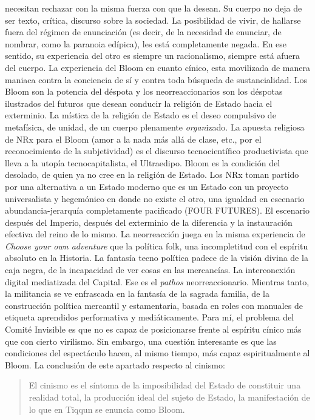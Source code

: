 \documentclass[
]{article}
\begin{document}
necesitan rechazar con la misma fuerza con que la desean. Su cuerpo no
deja de ser texto, crítica, discurso sobre la sociedad. La posibilidad
de vivir, de hallarse fuera del régimen de enunciación (es decir, de la
necesidad de enunciar, de nombrar, como la paranoia edípica), les está
completamente negada. En ese sentido, su experiencia del otro es siempre
un racionalismo, siempre está afuera del cuerpo. La experiencia del
Bloom en cuanto cínico, esta movilizada de manera maniaca contra la
conciencia de sí y contra toda búsqueda de sustancialidad. Los Bloom son
la potencia del déspota y los neorreaccionarios son los déspotas
ilustrados del futuros que desean conducir la religión de Estado hacia
el exterminio. La mística de la religión de Estado es el deseo
compulsivo de metafísica, de unidad, de un cuerpo plenamente
\emph{organ}izado. La apuesta religiosa de NRx para el Bloom (amor a la
nada más allá de clase, etc., por el reconocimiento de la subjetividad)
es el discurso tecnocientífico productivista que lleva a la utopía
tecnocapitalista, el Ultraedipo. Bloom es la condición del desolado, de
quien ya no cree en la religión de Estado. Los NRx toman partido por una
alternativa a un Estado moderno que es un Estado con un proyecto
universalista y hegemónico en donde no existe el otro, una igualdad en
escenario abundancia-jerarquía completamente pacificado (FOUR FUTURES).
El escenario después del Imperio, después del exterminio de la
diferencia y la instauración efectiva del reino de lo mismo. La
neorreacción juega en la misma experiencia de \emph{Choose your own
adventure} que la política folk, una incompletitud con el espíritu
absoluto en la Historia. La fantasía tecno política padece de la visión
divina de la caja negra, de la incapacidad de ver cosas en las
mercancías. La interconexión digital mediatizada del Capital. Ese es el
\emph{pathos} neorreaccionario. Mientras tanto, la militancia se ve
enfrascada en la fantasía de la sagrada familia, de la construcción
política mercantil y estamentaria, basada en roles con manuales de
etiqueta aprendidos performativa y mediáticamente. Para mí, el problema
del Comité Invisible es que no es capaz de posicionarse frente al
espíritu cínico más que con cierto virilismo. Sin embargo, una cuestión
interesante es que las condiciones del espectáculo hacen, al mismo
tiempo, más capaz espiritualmente al Bloom. La conclusión de este
apartado respecto al cinismo:

\begin{quote}
El cinismo es el síntoma de la imposibilidad del Estado de constituir
una realidad total, la producción ideal del sujeto de Estado, la
manifestación de lo que en Tiqqun se enuncia como Bloom.
\end{quote}
\end{document}
